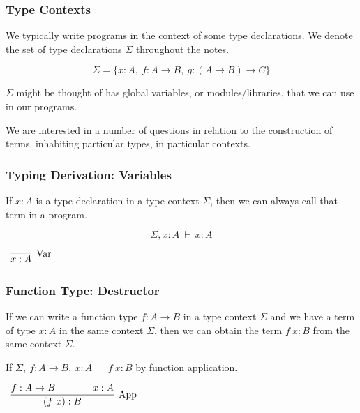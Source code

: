 \documentclass{beamer}
\theoremstyle{indentDefn} \newtheorem{defn}[]{Definition}
\begin{document}
\begin{frame}
  \frametitle{Type Contexts}

  We typically write programs in the context of some type declarations. We denote the set of type declarations $\Sigma$ throughout the notes. 

  $$\Sigma = \{x : A, \ f : A \to B, \ g : (A \to B) \to C\}$$

	$\Sigma$ might be thought of has global variables, or modules/libraries, that we can use in our programs.

 	We are interested in a number of questions in relation to the construction of terms, inhabiting particular types, in particular contexts. 
 	
 	\vspace{30mm}

\end{frame}

\begin{frame}
  \frametitle{Typing Derivation: Variables}

  If $x : A$ is a type declaration in a type context $\Sigma$, then we can always call that term in a program. 

  $$\Sigma, x : A \ \vdash \ x : A$$

  \vspace{10mm}

  \begin{center}
    $\begin{array}{c}
        \infer[\text{Var}]{x : A}{}
    \end{array}$
  \end{center}

  \vspace{40mm}

\end{frame}

\begin{frame}
  \frametitle{Function Type: Destructor}

  If we can write a function type $f: A \to B$ in a type context $\Sigma$ and we have a term of type $x : A$ in the same context $\Sigma$, then we can obtain the term $f \ x : B$ from the same context $\Sigma$. 

  If $\Sigma, \ f : A \to B, \ x : A \ \vdash \ f \ x : B$ by function application.

  \vspace{10mm}

  \begin{center}
    $\begin{array}{c}
        \infer[\text{App}]{(f \ x) : B}
          {f : A \to B \hspace{0.5cm} & \hspace{0.5cm} x : A}
    \end{array}$
  \end{center}

\vspace{30mm}

\end{frame}
\end{document}
